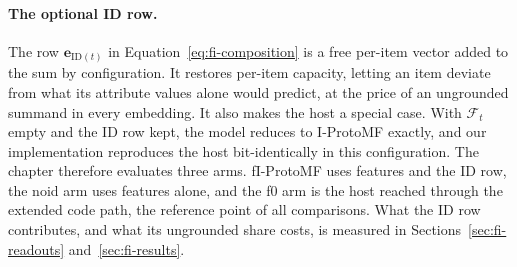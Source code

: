 \paragraph{The optional ID row.} The row $\mathbf{e}_{\mathrm{ID}(t)}$
in Equation~\ref{eq:fi-composition} is a free per-item vector added to
the sum by configuration. It restores per-item capacity, letting an item
deviate from what its attribute values alone would predict, at the price
of an ungrounded summand in every embedding. It also makes the host a
special case. With $\mathcal{F}_t$ empty and the ID row kept, the model
reduces to I-ProtoMF exactly, and our implementation reproduces the host
bit-identically in this configuration. The chapter therefore evaluates
three arms. fI-ProtoMF uses features and the ID row, the noid arm uses
features alone, and the f0 arm is the host reached through the extended
code path, the reference point of all comparisons. What the ID row
contributes, and what its ungrounded share costs, is measured in
Sections~\ref{sec:fi-readouts} and~\ref{sec:fi-results}.
